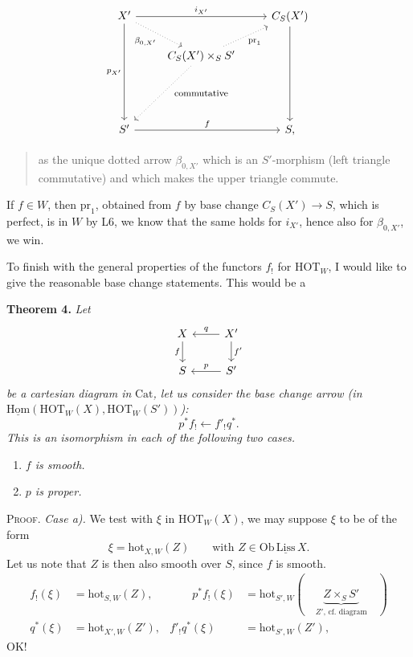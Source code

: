 \documentclass[11pt]{article}
\newcommand{\printedpage}[1]{\marginpar{\footnotesize p.~#1}}
\newcommand{\msp}[1]{\marginpar{\footnotesize [#1]}}
\newcommand{\HOT}{\mathrm{HOT}}
\newcommand{\hot}{\mathrm{hot}}
\newcommand{\Cat}{\mathrm{Cat}}
\newcommand{\Hom}{\mathrm{Hom}}
\newcommand{\pr}{\mathrm{pr}}
\begin{document}
\noindent\printedpage{99}%
\[
\begin{tikzcd}
X' \arrow[rr, "i_{X'}"] \arrow[ddd, "p_{X'}"'] \arrow[dr, dotted, "\beta_{0,X'}"'] & & C_S(X') \arrow[ddd] \\
& C_S(X') \times_S S' \arrow[ur, dotted, "\pr_1"'] \arrow[ddl, dotted] & \\
& \text{\footnotesize commutative} & \\
S' \arrow[rr, "f"] & & S,
\end{tikzcd}
\]

\begin{quote}
as the unique dotted arrow $\beta_{0,X'}$ which is an $S'$-morphism (left triangle commutative) and which makes the upper triangle commute.
\end{quote}

If $f \in W$, then $\pr_1$, obtained from $f$ by base change $C_S(X') \longrightarrow S$, which is perfect, is in $W$ by L6, we know that the same holds for $i_{X'}$, hence also for $\beta_{0,X'}$, we win.

\msp{page 162}To finish with the general properties of the functors $f_!$ for $\HOT_W$, I would like to give the reasonable base change statements. This would be a

\noindent\textbf{Theorem 4.} \textit{Let}
\[
\begin{tikzcd}
X \arrow[d, "f"'] & X' \arrow[l, "q"'] \arrow[d, "f'"] \\
S & S' \arrow[l, "p"']
\end{tikzcd}
\]
\textit{be a cartesian diagram in} $\Cat$\textit{, let us consider the base change arrow (in} $\underline{\Hom}(\HOT_W(X), \HOT_W(S'))$\textit{):}
\[
p^* f_! \longleftarrow f'_! q^*.
\]
\textit{This is an isomorphism in each of the following two cases.}

\begin{enumerate}
\item[\textit{a)}] \textit{$f$ is smooth.}
\item[\textit{b)}] \textit{$p$ is proper.}
\end{enumerate}

\textsc{Proof.} \textit{Case a).} We test with $\xi$ in $\HOT_W(X)$, we may suppose $\xi$ to be of the form
\[
\xi = \hot_{X,W}(Z) \qquad \text{with } Z \in \mathrm{Ob}\, \underline{\mathrm{Liss}}\, X.
\]
Let us note that $Z$ is then also smooth over $S$, since $f$ is smooth.
\[
\begin{aligned}
f_!(\xi) &= \hot_{S,W}(Z), &\qquad p^* f_!(\xi) &= \hot_{S',W}(\quad \underbrace{Z \times_S S'}_{\text{$Z'$, cf. diagram}} \quad) \\
q^*(\xi) &= \hot_{X',W}(Z'), & f'_! q^*(\xi) &= \hot_{S',W}(Z'),
\end{aligned}
\]
OK!
\end{document}
